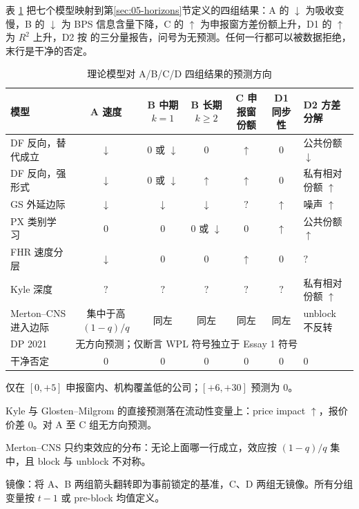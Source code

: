 \documentclass[a4paper,11pt]{ctexart}
\begin{document}
表 \ref{tab:04-predictions} 把七个模型映射到第\ref{sec:05-horizons}节定义的四组结果：A 的 $\downarrow$ 为吸收变慢，B 的 $\downarrow$ 为 BPS 信息含量下降，C 的 $\uparrow$ 为申报窗方差份额上升，D1 的 $\uparrow$ 为 $R^2$ 上升，D2 按 \citet{brogaardetal2022} 的三分量报告，问号为无预测。任何一行都可以被数据拒绝，末行是干净的否定。

\begin{table}[htbp]
\centering
\begin{threeparttable}
\caption{理论模型对 A/B/C/D 四组结果的预测方向}
\label{tab:04-predictions}
\small
\begin{tabular}{@{}lcccccl@{}}
\toprule
模型 & A 速度 & B 中期 $k=1$ & B 长期 $k\ge 2$ & C 申报窗份额 & D1 同步性 & D2 方差分解 \\
\midrule
DF 反向，替代成立 & $\downarrow$ & $0$ 或 $\downarrow$ & $0$ & $\uparrow$ & $0$ & 公共份额 $\downarrow$ \\
DF 反向，强形式 & $\downarrow$ & $0$ 或 $\downarrow$ & $\uparrow$ & $\uparrow$ & $0$ & 私有相对份额 $\uparrow$ \\
GS 外延边际 & $\downarrow$ & $\downarrow$ & $\downarrow$ & $?$ & $\uparrow$ & 噪声 $\uparrow$ \\
PX 类别学习 & $0$ & $0$ & $0$ 或 $\downarrow$ & $0$ & $\uparrow$ & 公共份额 $\uparrow$ \\
FHR 速度分层 & $\downarrow$\tnote{a} & $0$ & $0$ & $\uparrow$ & $0$ & $?$ \\
Kyle 深度\tnote{b} & $?$ & $?$ & $?$ & $?$ & $?$ & 私有相对份额 $\uparrow$ \\
Merton--CNS 进入边际\tnote{c} & 集中于高 $(1-q)/q$ & 同左 & 同左 & 同左 & 同左 & unblock 不反转 \\
DP 2021 & \multicolumn{6}{l}{无方向预测；仅断言 WPL 符号独立于 Essay 1 符号} \\
干净否定 & $0$ & $0$ & $0$ & $0$ & $0$ & $0$ \\
\bottomrule
\end{tabular}
\begin{tablenotes}\footnotesize
\item[a] 仅在 $[0,+5]$ 申报窗内、机构覆盖低的公司；$[+6,+30]$ 预测为 $0$。
\item[b] Kyle 与 Glosten--Milgrom 的直接预测落在流动性变量上：price impact $\uparrow$，报价价差 $0$。对 A 至 C 组无方向预测。
\item[c] Merton--CNS 只约束效应的分布：无论上面哪一行成立，效应按 $(1-q)/q$ 集中，且 block 与 unblock 不对称。
\item \citet{gaohuang2020} 镜像：将 A、B 两组箭头翻转即为事前锁定的基准，C、D 两组无镜像。所有分组变量按 $t-1$ 或 pre-block 均值定义。
\end{tablenotes}
\end{threeparttable}
\end{table}
\clearpage
\end{document}
